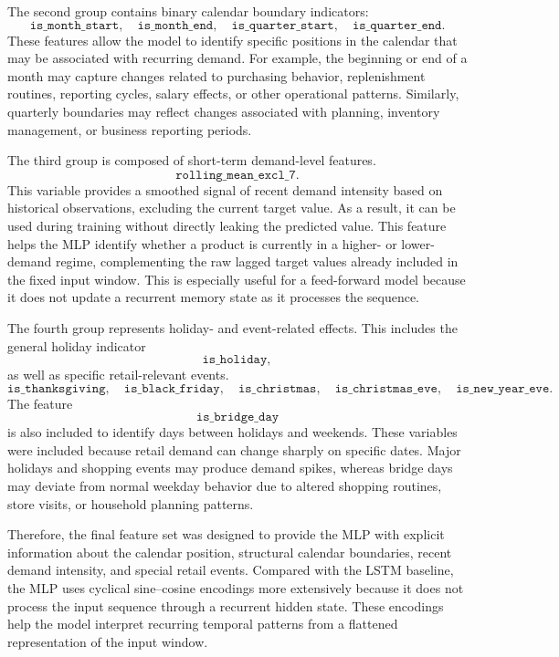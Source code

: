 The second group contains binary calendar boundary indicators:
\[
\texttt{is\_month\_start},\quad
\texttt{is\_month\_end},\quad
\texttt{is\_quarter\_start},\quad
\texttt{is\_quarter\_end}.
\]
These features allow the model to identify specific positions in the calendar that may be associated with recurring demand. For example, the beginning or end of a month may capture changes related to purchasing behavior, replenishment routines, reporting cycles, salary effects, or other operational patterns. Similarly, quarterly boundaries may reflect changes associated with planning, inventory management, or business reporting periods.

The third group is composed of short-term demand-level features.
\[
\texttt{rolling\_mean\_excl\_7}.
\]
This variable provides a smoothed signal of recent demand intensity based on historical observations, excluding the current target value. As a result, it can be used during training without directly leaking the predicted value. This feature helps the MLP identify whether a product is currently in a higher- or lower-demand regime, complementing the raw lagged target values already included in the fixed input window. This is especially useful for a feed-forward model because it does not update a recurrent memory state as it processes the sequence.

The fourth group represents holiday- and event-related effects. This includes the general holiday indicator
\[
\texttt{is\_holiday},
\]
as well as specific retail-relevant events.
\[
\texttt{is\_thanksgiving},\quad
\texttt{is\_black\_friday},\quad
\texttt{is\_christmas},\quad
\texttt{is\_christmas\_eve},\quad
\texttt{is\_new\_year\_eve}.
\]
The feature
\[
\texttt{is\_bridge\_day}
\]
is also included to identify days between holidays and weekends. These variables were included because retail demand can change sharply on specific dates. Major holidays and shopping events may produce demand spikes, whereas bridge days may deviate from normal weekday behavior due to altered shopping routines, store visits, or household planning patterns.

Therefore, the final feature set was designed to provide the MLP with explicit information about the calendar position, structural calendar boundaries, recent demand intensity, and special retail events. Compared with the LSTM baseline, the MLP uses cyclical sine--cosine encodings more extensively because it does not process the input sequence through a recurrent hidden state. These encodings help the model interpret recurring temporal patterns from a flattened representation of the input window.

